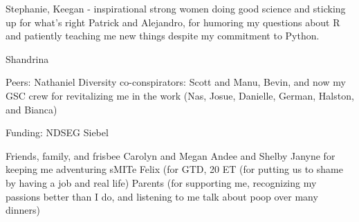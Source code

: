 Stephanie, Keegan - inspirational strong women doing good science and sticking up for what's right
Patrick and Alejandro, for humoring my questions about R and patiently teaching me new things despite my commitment to Python.


Shandrina

Peers:
Nathaniel
Diversity co-conspirators: Scott and Manu, Bevin, and now my GSC crew for revitalizing me in the work (Nas, Josue, Danielle, German, Halston, and Bianca)

Funding:
NDSEG
Siebel

Friends, family, and frisbee
Carolyn and Megan
Andee and Shelby
Janyne for keeping me adventuring
sMITe
Felix (for GTD, 20%
ET (for putting us to shame by having a job and real life)
Parents (for supporting me, recognizing my passions better than I do, and listening to me talk about poop over many dinners)
